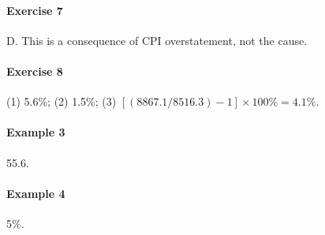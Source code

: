 \documentclass[12pt]{article}
\numberwithin{equation}{section}
\begin{document}
\paragraph{Exercise 7}
D. This is a consequence of CPI overstatement, not the cause.

\paragraph{Exercise 8}
(1) 5.6\%; (2) 1.5\%; (3) $[(8867.1/8516.3) - 1]\times100\% = 4.1\%$.

\paragraph{Example 3}
55.6.

\paragraph{Example 4}
5\%.
\end{document}
